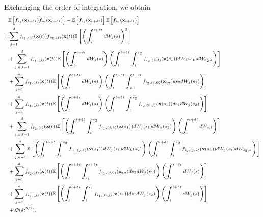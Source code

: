 %
Exchanging the order of integration, we obtain
%
\begin{equation}
\scriptsize
\begin{aligned}
&\mathbb{E} \left[ f_{i_1}(\mathbf{x}_{t + \delta t}) f_{i_2}(\mathbf{x}_{t + \delta t}) \right]
- \mathbb{E} \left[ f_{i_1}(\mathbf{x}_{t + \delta t}) \right] \mathbb{E} \left[ f_{i_2}(\mathbf{x}_{t + \delta t}) \right] \\
=&
 \sum_{j=1}^d f_{{i_1},(j)}(\mathbf{x}(t)) f_{{i_2},(j)}(\mathbf{x}(t)) \mathbb{E} \left[ \left( \int_t^{t + \delta t} dW_j(s) \right)^2 \right] \\
&+ \sum_{j,k,l=1}^d f_{{i_1},(j)}(\mathbf{x}(t)) \mathbb{E} \left[ \left( \int_t^{t + \delta t} dW_j(s) \right) \left( \int_t^{t+\delta t} \int_t^{s_2} f_{{i_2},(k,l)}(\mathbf{x}(s_1)) dW_k(s_1) dW_{s_2, l} \right) \right] \\
&+ \sum_{j=1}^d f_{{i_1},(j)}(\mathbf{x}(t)) \mathbb{E} \left[ \left( \int_t^{t + \delta t} dW_j(s) \right)\left( \int_t^{t+\delta t} \int_{s_1}^{t+\delta t} f_{{i_2},(j,0)}(\mathbf{x}_{s_2}) ds_2 dW_j(s_1)  \right) \right]\\
&+ \sum_{j=1}^d f_{{i_1},(j)}(\mathbf{x}(t)) \mathbb{E} \left[ \left( \int_t^{t + \delta t} dW_j(s) \right) \left( \int_t^{t+\delta t} \int_t^{s_2} f_{{i_2},(0,j)}(\mathbf{x}(s_1)) ds_1 dW_j(s_2) \right) \right] \\
&+  \sum_{j, k, l=1}^d  f_{{i_2},(l)}(\mathbf{x}(t))\mathbb{E} \left[ \left( \int_t^{t+\delta t} \int_t^{s_2} f_{{i_1},(j,k)}(\mathbf{x}(s_1)) dW_j(s_1) dW_k(s_2) \right) \left( \int_t^{t + \delta t} dW_{s,l} \right) \right] \\
&+ \sum_{j, k=1}^d \mathbb{E} \left[ \left( \int_t^{t+\delta t} \int_t^{s_2} f_{{i_1},(j,k)}(\mathbf{x}(s_1)) dW_j(s_1) dW_k(s_2) \right) \left( \int_t^{t+\delta t} \int_t^{s_2} f_{{i_2},(j,k)}(\mathbf{x}(s_1)) dW_j(s_1) dW_{s_2,k} \right) \right] \\
&+  \sum_{j=1}^d f_{{i_2},(j)}(\mathbf{x}(t)) \mathbb{E} \left[ \left( \int_t^{t+\delta t} \int_{s_1}^{t + \delta t} f_{{i_1},(j,0)}(\mathbf{x}_{s_2}) ds_2 dW_j(s_1)   \right) \left( \int_t^{t + \delta t} dW_j(s) \right) \right]\\
&+   \sum_{j=1}^d  f_{{i_2},(j)}(\mathbf{x}(t)) \mathbb{E} \left[ \left( \int_t^{t+\delta t} \int_t^{s_2} f_{{i_1},(0,j)}(\mathbf{x}(s_1)) ds_1 dW_j(s_2)  \right) \left(\int_t^{t + \delta t} dW_j(s) \right) \right] \\
&+ \mathcal{O} (\delta t^{5/2}),
\end{aligned}
\end{equation}
